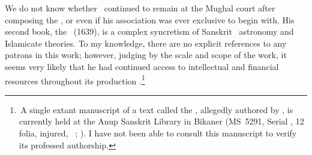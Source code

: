 We do not know whether \Nityananda\ continued to remain at the Mughal court after composing the \Siddhantasindhu, or even if his association was ever exclusive to begin with. His second book, the \Sarvasiddhantaraja\ (1639), is a complex syncretism of Sanskrit \siddhantic\ astronomy and Islamicate theories. To my knowledge, there are no explicit references to any patrons in this work; however, judging by the scale and scope of the work, it seems very likely that he had continued access to intellectual and financial resources throughout its production \parencite[more on this in][]{MisraTD}.\footnote{\,A single extant manuscript of a text called the \Shahajahamganita, allegedly authored by \Nityananda, is currently held at the Anup Sanskrit Library in Bikaner (MS~5291, Serial , 12 folia, injured, \vid\ \cite[CESS A3, p.\thinspace 174a]{PingreeCESS}; \cite[393]{AnupSanskritLibrary}). I have not been able to consult this manuscript to verify its professed authorship.} 

 






